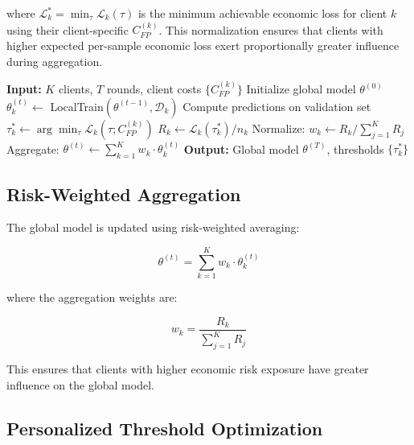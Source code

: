 \documentclass[conference]{IEEEtran}
\begin{document}
where $\mathcal{L}_k^* = \min_\tau \mathcal{L}_k(\tau)$ is the minimum achievable economic loss for client $k$ using their client-specific $C_{FP}^{(k)}$. This normalization ensures that clients with higher expected per-sample economic loss exert proportionally greater influence during aggregation.

\begin{algorithm}[t]
\caption{Risk-Weighted FL with Client-Specific Costs}
\label{alg:risk_weighted}
\begin{algorithmic}[1]
\STATE \textbf{Input:} $K$ clients, $T$ rounds, client costs $\{C_{FP}^{(k)}\}$
\STATE Initialize global model $\theta^{(0)}$
        \STATE $\theta_k^{(t)} \leftarrow$ LocalTrain$(\theta^{(t-1)}, \mathcal{D}_k)$
        \STATE Compute predictions on validation set
        \STATE $\tau_k^* \leftarrow \arg\min_\tau \mathcal{L}_k(\tau; C_{FP}^{(k)})$
        \STATE $R_k \leftarrow \mathcal{L}_k(\tau_k^*) / n_k$
    \ENDFOR
    \STATE Normalize: $w_k \leftarrow R_k / \sum_{j=1}^{K} R_j$
    \STATE Aggregate: $\theta^{(t)} \leftarrow \sum_{k=1}^{K} w_k \cdot \theta_k^{(t)}$
\ENDFOR
\STATE \textbf{Output:} Global model $\theta^{(T)}$, thresholds $\{\tau_k^*\}$
\end{algorithmic}
\end{algorithm}

\subsection{Risk-Weighted Aggregation}

The global model is updated using risk-weighted averaging:

\begin{equation}
    \theta^{(t)} = \sum_{k=1}^{K} w_k \cdot \theta_k^{(t)}
    \label{eq:aggregation}
\end{equation}

where the aggregation weights are:

\begin{equation}
    w_k = \frac{R_k}{\sum_{j=1}^{K} R_j}
    \label{eq:weights}
\end{equation}

This ensures that clients with higher economic risk exposure have greater influence on the global model.

\subsection{Personalized Threshold Optimization}
\end{document}
